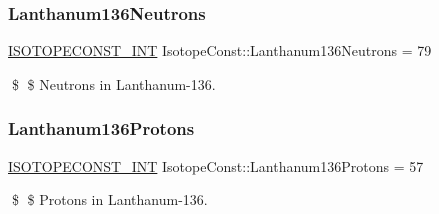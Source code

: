 \subsubsection{\texorpdfstring{Lanthanum136\+Neutrons}{Lanthanum136Neutrons}}
{\footnotesize\ttfamily \mbox{\hyperlink{group___isotope_const-_macros_ga5f18360b3e99483a35c32d789e62621c}{I\+S\+O\+T\+O\+P\+E\+C\+O\+N\+S\+T\+\_\+\+I\+NT}} Isotope\+Const\+::\+Lanthanum136\+Neutrons = 79}

\$ \$ Neutrons in Lanthanum-\/136. \mbox{\label{group___isotope_const-_lanthanum-_la136_gaf7fde68eead65b9ff66e74a7043ea2db}} 
\subsubsection{\texorpdfstring{Lanthanum136\+Protons}{Lanthanum136Protons}}
{\footnotesize\ttfamily \mbox{\hyperlink{group___isotope_const-_macros_ga5f18360b3e99483a35c32d789e62621c}{I\+S\+O\+T\+O\+P\+E\+C\+O\+N\+S\+T\+\_\+\+I\+NT}} Isotope\+Const\+::\+Lanthanum136\+Protons = 57}

\$ \$ Protons in Lanthanum-\/136. 